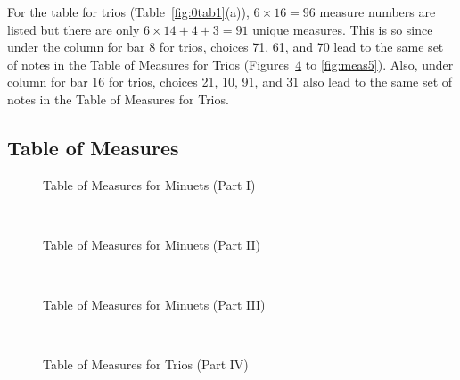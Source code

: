 \documentclass[a4paper,x11names,svgnames,10pt]{article}
\begin{document}
{For the table for trios (Table~\ref{fig:0tab1}(a)), $6\times 16 = 96$ measure numbers are listed but there are only $6\times 14 + 4 + 3 = 91$ unique measures.  This is so since under the column for bar 8 for trios, choices 71, 61, and 70 lead to the same set of notes in the Table of Measures for Trios (Figures~\ref{fig:meas4} to \ref{fig:meas5}).  Also, under column for bar 16 for trios, choices 21, 10, 91, and 31 also lead to the same set of notes in the Table of Measures for Trios.

\nopagebreak[4]
\subsection{Table of Measures}\label{tableMeas}

\begin{figure}[H]
	\centering
	\def\svgwidth{0.975\columnwidth}
	
	\caption{Table of Measures for Minuets (Part I)}
	\label{fig:meas1}
\end{figure}

\newpage
${}_{}$\\
\vspace{0.10in}
\begin{figure}[H]
	\centering
	\def\svgwidth{0.975\columnwidth}
	
	\caption{Table of Measures for Minuets (Part II)}
	\label{fig:meas2}
\end{figure}

\newpage
${}_{}$\\
\vspace{0.10in}
\begin{figure}[H]
	\centering
	\def\svgwidth{0.975\columnwidth}
	
	\caption{Table of Measures for Minuets (Part III)}
	\label{fig:meas3}
\end{figure}

\newpage
${}_{}$\\
\vspace{0.10in}
\begin{figure}[H]
	\centering
	\def\svgwidth{0.975\columnwidth}
	
	\caption{Table of Measures for Trios (Part IV)}
	\label{fig:meas4}
\end{figure}

}
\end{document}
